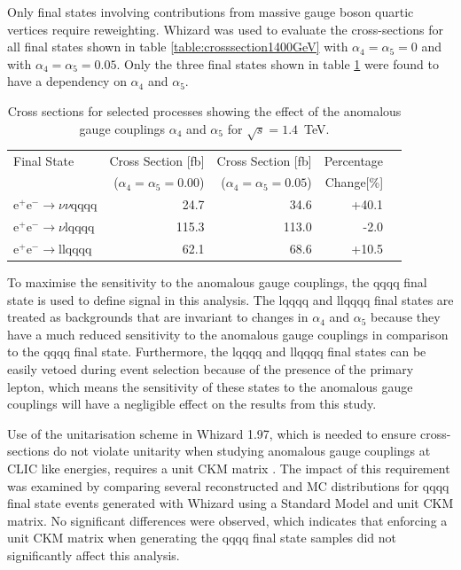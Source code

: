 Only final states involving contributions from massive gauge boson quartic vertices require reweighting.  Whizard was used to evaluate the cross-sections for all final states shown in table \ref{table:crosssection1400GeV} with $\alpha_{4}=\alpha_{5}=0$ and with $\alpha_{4}=\alpha_{5}=0.05$.  Only the three final states shown in table \ref{table:crosssectionsensitivity1400} were found to have a dependency on $\alpha_{4}$ and $\alpha_{5}$.  

\begin{table}[h!]
\centering
\begin{tabular}{ l r r r r }
\hline
Final State & Cross Section [fb] & Cross Section [fb] & Percentage \\ 
& ($\alpha_{4} = \alpha_{5} = 0.00$) & ($\alpha_{4} = \alpha_{5} = 0.05$) & Change[\%] \\ 
\hline
$\text{e}^{+}\text{e}^{-} \rightarrow \nu{\nu}\text{qqqq}$ & 24.7 & 34.6 & +40.1 \\
$\text{e}^{+}\text{e}^{-} \rightarrow \nu\text{lqqqq}$ & 115.3 & 113.0 & -2.0 \\
$\text{e}^{+}\text{e}^{-} \rightarrow \text{llqqqq}$ & 62.1 & 68.6 & +10.5 \\
\hline
\end{tabular}
\caption[Cross sections for selected processes showing the effect of the anomalous gauge couplings $\alpha_{4}$ and $\alpha_{5}$ for $\sqrt{s}=1.4$~TeV.]{Cross sections for selected processes showing the effect of the anomalous gauge couplings $\alpha_{4}$ and $\alpha_{5}$ for $\sqrt{s}=1.4$~TeV.}
\label{table:crosssectionsensitivity1400}
\end{table}

To maximise the sensitivity to the anomalous gauge couplings, the \nu{\nu}qqqq final state is used to define signal in this analysis.  The l{\nu}qqqq and llqqqq final states are treated as backgrounds that are invariant to changes in $\alpha_{4}$ and $\alpha_{5}$ because they have a much reduced sensitivity to the anomalous gauge couplings in comparison to the \nu{\nu}qqqq final state.  Furthermore, the l{\nu}qqqq and llqqqq final states can be easily vetoed during event selection because of the presence of the primary lepton, which means the sensitivity of these states to the anomalous gauge couplings will have a negligible effect on the results from this study.

Use of the unitarisation scheme in Whizard 1.97, which is needed to ensure cross-sections do not violate unitarity when studying anomalous gauge couplings at CLIC like energies, requires a unit CKM matrix \cite{WhizardManual}.  The impact of this requirement was examined by comparing several reconstructed and MC distributions for \nu{\nu}qqqq final state events generated with Whizard using a Standard Model and unit CKM matrix.  No significant differences were observed, which indicates that enforcing a unit CKM matrix when generating the \nu{\nu}qqqq final state samples did not significantly affect this analysis.  

